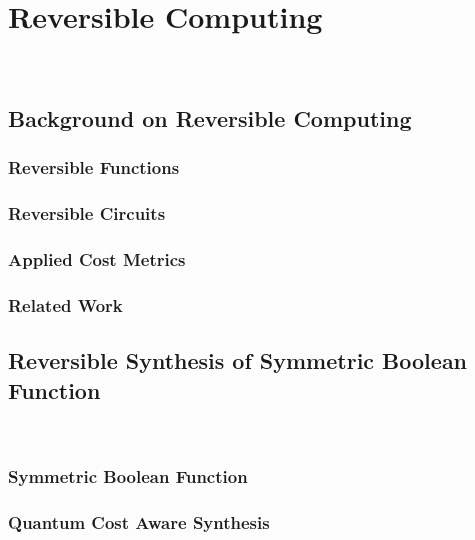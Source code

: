 \documentclass[10pt,letterpaper,twoside,openright]{book}
\begin{document}

\part{Reversible Computing}~\label{part:reversible}
\chapter{Background on Reversible Computing}

\section{Reversible Functions}

\newpage

\section{Reversible Circuits}

\newpage

\section{Applied Cost Metrics}

\newpage

\section{Related Work}

\newpage

\chapter{Reversible Synthesis of Symmetric Boolean Function}~\label{ch:rev-synth-symm}

\section{Symmetric Boolean Function}

\newpage

\section{Quantum Cost Aware Synthesis}
\end{document}
